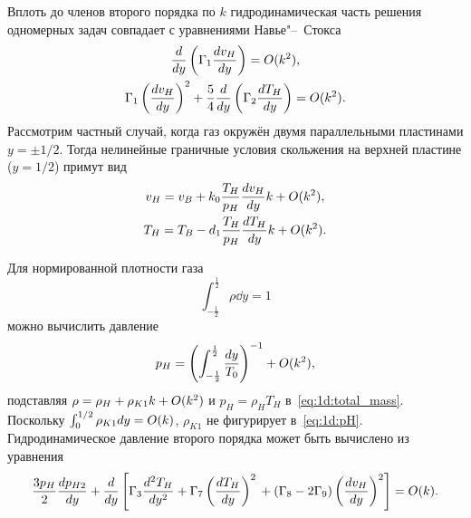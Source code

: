 Вплоть до членов второго порядка по \(k\) гидродинамическая часть решения одномерных задач
совпадает с уравнениями Навье"--~Стокса
\begin{gather}
    \der{y}\left(\Gamma_1\der[v_H]{y}\right) = \OO{k^2}, \label{eq:1d:asymptotic_v}\\
    \Gamma_1\left(\der[v_H]{y}\right)^2
        + \frac54\der{y}\left(\Gamma_2\der[T_H]{y}\right) = \OO{k^2}. \label{eq:1d:asymptotic_T}
\end{gather}
Рассмотрим частный случай, когда газ окружён двумя параллельными пластинами \(y=\pm1/2\).
Тогда нелинейные граничные условия скольжения на верхней пластине (\(y=1/2\)) примут вид
\begin{gather}
    v_H = v_B + k_0\frac{T_H}{p_H}\der[v_H]{y}k + \OO{k^2}, \label{eq:1d:boundary_v}\\
    T_H = T_B - d_1\frac{T_H}{p_H}\der[T_H]{y}k + \OO{k^2}. \label{eq:1d:boundary_T}
\end{gather}

Для нормированной плотности газа
\begin{equation}\label{eq:1d:total_mass}
    \int_{-\frac12}^\frac12\rho\dd{y} = 1
\end{equation}
можно вычислить давление
\begin{equation}\label{eq:1d:pH}
    p_H = \left(\int_{-\frac12}^\frac12\frac{\dd y}{T_0}\right)^{-1} + \OO{k^2},
\end{equation}
подставляя \(\rho = \rho_H + \rho_{K1}k + \OO{k^2}\) и \(p_H = \rho_H T_H\) в~\eqref{eq:1d:total_mass}.
Поскольку \(\int_{0}^{1/2}\rho_{K1}\dd{y} = \OO{k}\), \(\rho_{K1}\) не фигурирует в~\eqref{eq:1d:pH}.
Гидродинамическое давление второго порядка может быть вычислено из уравнения
\begin{equation}\label{eq:1d:pH2}
    \frac{3p_H}{2}\der[p_{H2}]{y}
        + \der{y}\left[ \Gamma_3\derdual[T_H]{y} + \Gamma_7\left(\der[T_H]{y}\right)^2 \\
            + (\Gamma_8-2\Gamma_9)\left(\der[v_H]{y}\right)^2 \right] = \OO{k}.
\end{equation}

